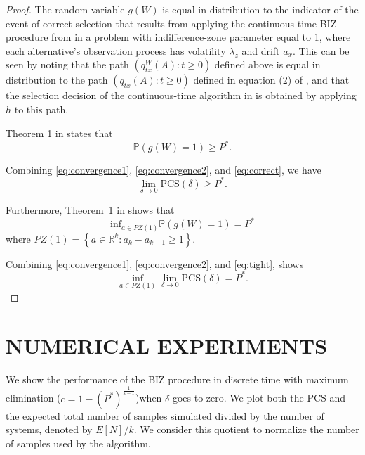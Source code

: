 \documentclass{wscpaperproc}
\theoremstyle{wsc}
\begin{document}
\begin{proof}
The random variable $g(W)$ is equal in distribution to the indicator of the event of correct selection that results from applying the continuous-time BIZ procedure from \cite{Frazier:BIZ} in a problem with indifference-zone parameter equal to 1, where each alternative's observation process has volatility $\lambda_z$ and drift $a_x$.
This can be seen by noting that the path $(q^{W}_{tx}(A) : t\ge0)$ defined above is equal in distribution to the path $(q_{tx}(A) : t\ge0)$ defined in equation (2) of , and that the selection decision of the continuous-time algorithm in  is obtained by applying $h$ to this path.

Theorem 1 in  states that 
\begin{equation}
\mathbb{P}\left(g\left(W\right)=1\right)\ge P^{*}.
\label{eq:correct}
\end{equation}

Combining 
\eqref{eq:convergence1}, 
\eqref{eq:convergence2}, and
\eqref{eq:correct}, we have
\begin{equation*}
    \lim_{\delta\to0} \mbox{PCS}(\delta) \ge P^*.
\end{equation*}

Furthermore, Theorem~1 in  shows that 
\begin{equation}
\mbox{inf}_{a\in PZ\left(1\right)}\mathbb{P}\left(g\left(W\right)=1\right)=P^{*}
\label{eq:tight}
\end{equation}
where $PZ\left(1\right)=\left\{ a\in\mathbb{R}^{k}:a_{k}-a_{k-1}\geq1\right\} $. 


Combining 
\eqref{eq:convergence1}, 
\eqref{eq:convergence2}, and
\eqref{eq:tight}, shows
\begin{equation*}
\inf_{a\in PZ\left(1\right)}\lim_{\delta\rightarrow0}\mbox{PCS}(\delta)=P^{*}.
\end{equation*}

\end{proof}



\section{NUMERICAL EXPERIMENTS}

We show the performance of the BIZ procedure in discrete time with maximum elimination
($c=1-(P^*)^\frac{1}{k-1}$)when $\delta$ goes to zero. We plot both the PCS and the expected total number 
of samples simulated divided by the number of systems, denoted by $E[N]/k$. We consider this quotient 
to normalize the number of samples used by the algorithm.
\end{document}
